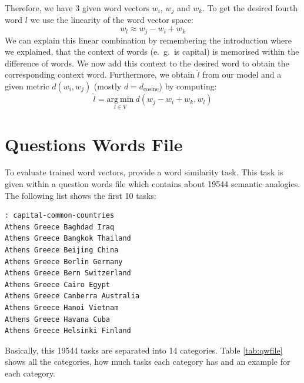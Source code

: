 Therefore, we have $3$ given word vectors $w_i$, $w_j$ and $w_k$. To get the 
desired fourth word $l$ we use the linearity of the word vector space:
\[
w_l \approx w_j - w_i + w_k
\]
We can explain this linear combination by remembering the introduction where
we explained, that the context of words (e.~g.~is capital) is memorised within
the difference of words. We now add this context to the desired word to obtain
the corresponding context word. Furthermore, we obtain $\widehat{l}$ from our 
model and a given metric $d(w_i, w_j)$ (mostly $d = d_\mathrm{cosine}$) by
computing:
\[
\widehat{l} = \underset{l \in V}{\mathrm{arg~min}}\ d(w_j - w_i + w_k, w_l)
\]


\section{Questions Words File}

To evaluate trained word vectors, \cite{mikolov2013efficient} provide a word
similarity task. This task is given within a question words file which
contains about 19544 semantic analogies. The following list shows the first
10 tasks:

\begin{Shaded}
\begin{verbatim}
: capital-common-countries
Athens Greece Baghdad Iraq
Athens Greece Bangkok Thailand
Athens Greece Beijing China
Athens Greece Berlin Germany
Athens Greece Bern Switzerland
Athens Greece Cairo Egypt
Athens Greece Canberra Australia
Athens Greece Hanoi Vietnam
Athens Greece Havana Cuba
Athens Greece Helsinki Finland
\end{verbatim}
\end{Shaded}

Basically, this 19544 tasks are separated into 14 categories. Table \ref{tab:qwfile}
shows all the categories, how much tasks each category has and an example for each
category.

